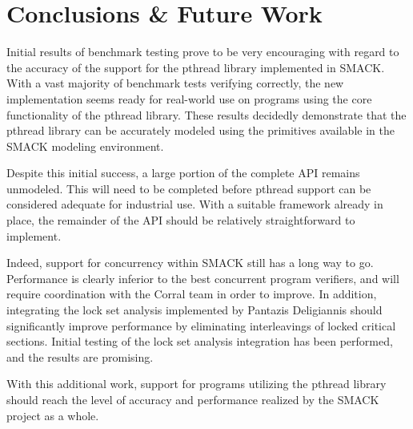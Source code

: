 \chapter{Conclusions \& Future Work}\label{ch:conclusion}
Initial results of benchmark testing prove to be very encouraging with
regard to the accuracy of the support for the pthread library
implemented in SMACK.  With a vast majority of benchmark tests
verifying correctly, the new implementation seems ready for real-world
use on programs using the core functionality of the pthread library.
These results decidedly demonstrate that the pthread library can be
accurately modeled using the primitives available in the SMACK
modeling environment.

Despite this initial success, a large portion of the complete API
remains unmodeled.  This will need to be completed before pthread
support can be considered adequate for industrial use.  With a
suitable framework already in place, the remainder of the  API should
be relatively straightforward to implement.

Indeed, support for concurrency within SMACK still has a long way to
go.  Performance is clearly inferior to the best concurrent program
verifiers, and will require coordination with the Corral team in order
to improve. In addition, integrating the lock set analysis implemented
by Pantazis Deligiannis should significantly improve performance by
eliminating interleavings of locked critical sections.  Initial
testing of the lock set analysis integration has been performed, and
the results are promising.

With this additional work, support for programs utilizing the pthread
library should reach the level of accuracy and performance realized by
the SMACK project as a whole.

